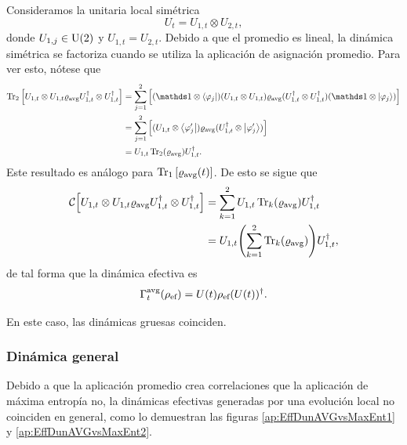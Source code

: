 Consideramos la unitaria local simétrica
\begin{equation}
    U_{t}=U_{1,t}\otimes U_{2,t},\nonumber
\end{equation}
donde $U_{1,j}\in\text{U}(2)$ y $U_{1,t}=U_{2,t}$. Debido a que el promedio es lineal, la dinámica simétrica se factoriza cuando se utiliza la aplicación de asignación promedio. Para ver esto, nótese que 
\begin{align}
\Tr_{2}\qty[U_{1,t}\otimes U_{1,t} \varrho_{\avg} U_{1,t}^{\dag}\otimes U_{1,t}^{\dag}]&=\sum_{j=1}^{2}\qty[(\Id\otimes \bra{\varphi_{j}}) (U_{1,t}\otimes U_{1,t}) \varrho_{\avg} (U_{1,t}^{\dag}\otimes U_{1,t}^{\dag})(\Id\otimes \ket{\varphi_{j}})]\nonumber \\
&=\sum_{j=1}^{2}\qty[(U_{1,t}\otimes \bra{\varphi_{j}'}) \varrho_{\avg} (U_{1,t}^{\dag}\otimes \ket{\varphi_{j}'})]\nonumber \\
&=U_{1,t}\Tr_{2}(\varrho_{\avg})U_{1,t}^{\dag}.\nonumber
\end{align}
Este resultado es análogo para $\Tr_{1}\qty[\varrho_{\text{avg}}(t)]$. De esto se sigue que
\begin{align}
    \mathcal{C}\qty[U_{1,t}\otimes U_{1,t} \varrho_{\text{avg}} U_{1,t}^{\dag}\otimes U_{1,t}^{\dag}]&=\sum_{k=1}^{2}U_{1,t}\Tr_{k}(\varrho_{\text{avg}})U_{1,t}^{\dag}\nonumber\\
    &=U_{1,t}\qty(\sum_{k=1}^{2}\Tr_{k}(\varrho_{\text{avg}}))U_{1,t}^{\dag},\nonumber
\end{align}
de tal forma que la dinámica efectiva es
\begin{equation}
    \Gamma_{t}^{\text{avg}}(\rho_{\text{ef}})=U(t)\rho_{\text{ef}}(U(t))^{\dag}.\nonumber
\end{equation}

En este caso, las dinámicas gruesas coinciden.

\subsubsection{Dinámica general}

Debido a que la aplicación promedio crea correlaciones que la aplicación de máxima entropía no, la dinámicas efectivas generadas por una evolución local no coinciden en general, como lo demuestran las figuras \ref{ap:EffDunAVGvsMaxEnt1} y \ref{ap:EffDunAVGvsMaxEnt2}.

